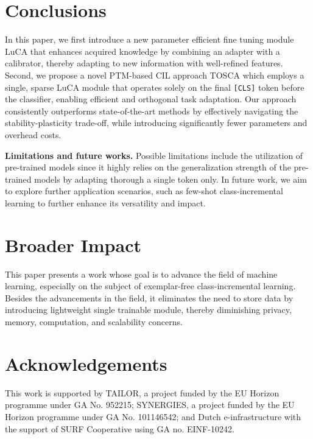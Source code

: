 \section{Conclusions}
In this paper, we first introduce a new parameter efficient fine tuning module LuCA that enhances acquired knowledge by combining an adapter with a calibrator, thereby adapting to new information with well-refined features. Second, we propose a novel PTM-based CIL approach TOSCA which employs a single, sparse LuCA module that operates solely on the final \texttt{[CLS]} token before the classifier, enabling efficient and orthogonal task adaptation. Our approach consistently outperforms state-of-the-art methods by effectively navigating the stability-plasticity trade-off, while introducing significantly fewer parameters and overhead costs.

\textbf{Limitations and future works.}
Possible limitations include the utilization of pre-trained models since it highly relies on the generalization strength of the pre-trained models by adapting thorough a single token only.
In future work, we aim to explore further application scenarios, such as few-shot class-incremental learning to further enhance its versatility and impact.

\section*{Broader Impact}
This paper presents a work whose goal is to advance the field of machine learning, especially on the subject of exemplar-free class-incremental learning. Besides the advancements in the field, it eliminates the need to store data by introducing lightweight single trainable module, thereby diminishing privacy, memory, computation, and scalability concerns.

\section*{Acknowledgements}
This work is supported by TAILOR, a project funded by the EU Horizon programme under GA No. 952215; SYNERGIES, a project funded by the EU Horizon programme under GA No. 101146542; and Dutch e-infrastructure with the support of SURF Cooperative using GA no. EINF-10242.
